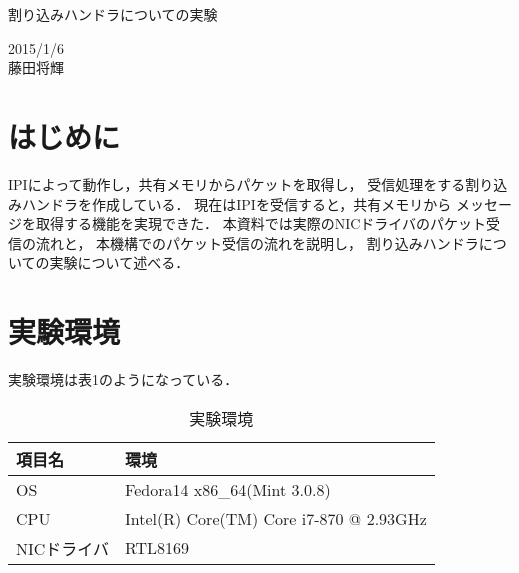 \documentclass[12pt]{jsarticle}
\begin{document}

\begin{center}
{\LARGE 割り込みハンドラについての実験}
\end{center}

\begin{flushright}
  2015/1/6\\
  藤田将輝
\end{flushright}
\section{はじめに}
IPIによって動作し，共有メモリからパケットを取得し，
受信処理をする割り込みハンドラを作成している．
現在はIPIを受信すると，共有メモリから
メッセージを取得する機能を実現できた．
本資料では実際のNICドライバのパケット受信の流れと，
本機構でのパケット受信の流れを説明し，
割り込みハンドラについての実験について述べる．
\section{実験環境}
実験環境は表1のようになっている．
\begin{table}[htbp]
\caption{実験環境}
\label{kankyou}
\begin{center}
\begin{tabular}{|l|l|}   \hline 
項目名      & 環境    \\ \hline \hline
OS          & Fedora14 x86\_64(Mint 3.0.8)  \\ \hline
CPU         & Intel(R) Core(TM) Core i7-870 @ 2.93GHz \\ \hline
NICドライバ & RTL8169    \\ \hline
           
\end{tabular}
\end{center}
\end{table}
\end{document}
